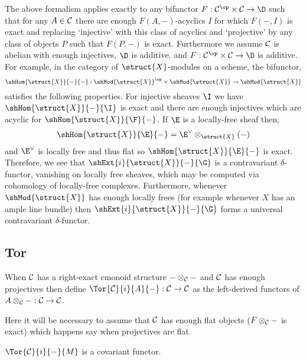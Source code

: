 \documentclass[12pt]{article}
\begin{document}
\begin{rmk}
The above formalism applies exactly to any bifunctor $F : \C^\op \times \C \to \D$ such that for any $A \in \mathcal{C}$ there are enough $F(A, -)$-acyclics $I$ for which $F(-,I)$ is exact and replacing `injective' with this class of acyclics and `projective' by any class of objects $P$ such that $F(P, -)$ is exact. Furthermore we assume $\mathcal{C}$ is abelian with enough injectives, $\D$ is additive, and $F : \C^\op \times \C \to \D$ is additive. 
\bigskip\\
For example, in the category of $\struct{X}$-modules on a scheme, the bifunctor,
\[ \shHom{\struct{X}}{-}{-} : \shMod{\struct{X}}^\op \times \shMod{\struct{X}} \to \shMod{\struct{X}} \] satisfies the following properties. For injective sheaves $\I$ we have $\shHom{\struct{X}}{-}{\I}$ is exact and there are enough injectives which are  acyclic for $\shHom{\struct{X}}{\F}{-}$. If $\E$ is a locally-free sheaf then,
\[ \shHom{\struct{X}}{\E}{-} = \E^\vee \otimes_{\struct{X}} (-) \]
and $\E^\vee$ is locally free and thus flat so $\shHom{\struct{X}}{\E}{-}$ is exact. Therefore, we see that $\shExt{i}{\struct{X}}{-}{\G}$ is a contravariant $\delta$-functor, vanishing on locally free sheaves, which may be computed via cohomology of locally-free complexes. Furthermore, whenever $\shMod{\struct{X}}$ has enough locally frees (for example whenever $X$ has an ample line bundle) then $\shExt{i}{\struct{X}}{-}{\G}$ forms a universal contravariant $\delta$-functor.
\end{rmk}

\subsection{Tor}

\begin{defn}
When $\mathcal{C}$ has a right-exact cmonoid structure $- \otimes_{\mathcal{C}} -$ and $\mathcal{C}$ has enough projectives then define $\Tor{\C}{i}{A}{-} : \C \to \C$ as the left-derived functors of $A \otimes_{\mathcal{C}} - : \mathcal{C} \to \mathcal{C}$. 
\end{defn}

\begin{rmk}
Here it will be necessary to assume that $\mathcal{C}$ has enough flat objects ($F \otimes_{\mathcal{C}} -$ is exact) which happens say when projectives are flat. 
\end{rmk}

\begin{lemma}
$\Tor{\C}{i}{-}{M}$ is a covariant functor.
\end{lemma}
\end{document}
